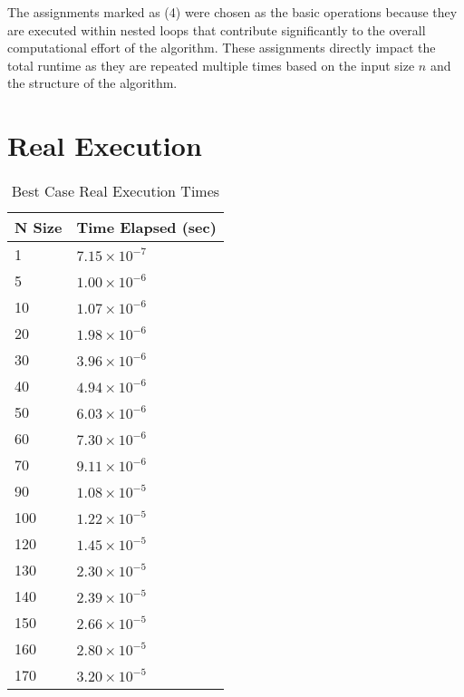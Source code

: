 \documentclass[11pt, oneside, a4paper]{article}
\begin{document}
The assignments marked as (4) were chosen as the basic operations because they are executed within nested loops that contribute significantly to the overall computational effort of the algorithm. These assignments directly impact the total runtime as they are repeated multiple times based on the input size \( n \) and the structure of the algorithm. 

	\section{Real Execution}

	\begin{table}[H]
		\centering
		\begin{tabular}{|l|l|} \hline
			\textbf{N Size} & \textbf{Time Elapsed (sec)} \\ \hline
			1 & \( 7.15 \times 10^{-7}\) \\ \hline
			5 & \( 1.00 \times 10^{-6}\) \\ \hline
			10 & \( 1.07 \times 10^{-6}\) \\ \hline
			20 & \( 1.98 \times 10^{-6}\) \\ \hline
			30 & \( 3.96 \times 10^{-6}\) \\ \hline
			40 & \( 4.94 \times 10^{-6}\) \\ \hline
			50 & \( 6.03 \times 10^{-6}\) \\ \hline
			60 & \( 7.30 \times 10^{-6}\) \\ \hline
			70 & \( 9.11 \times 10^{-6}\) \\ \hline
			90 & \( 1.08 \times 10^{-5}\) \\ \hline
			100 & \( 1.22 \times 10^{-5}\) \\ \hline
			120 & \( 1.45 \times 10^{-5}\) \\ \hline
			130 & \( 2.30 \times 10^{-5}\) \\ \hline
			140 & \( 2.39 \times 10^{-5}\) \\ \hline
			150 & \( 2.66 \times 10^{-5}\) \\ \hline
			160 & \( 2.80 \times 10^{-5}\) \\ \hline
			170 & \( 3.20 \times 10^{-5}\) \\ \hline
		\end{tabular}
		\caption{Best Case Real Execution Times}
		\label{tab:best-case}
	\end{table}
\end{document}
